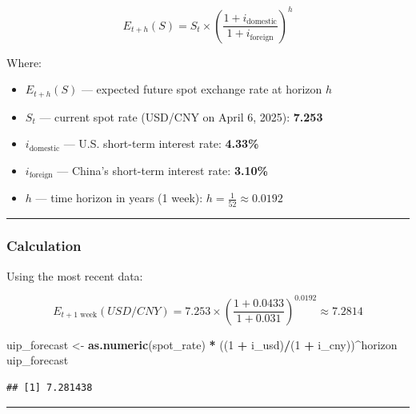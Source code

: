 \documentclass[
]{article}
\newenvironment{Shaded}{\begin{snugshade}}{\end{snugshade}}
\newcommand{\DecValTok}[1]{\textcolor[rgb]{0.00,0.00,0.81}{#1}}
\newcommand{\FunctionTok}[1]{\textcolor[rgb]{0.13,0.29,0.53}{\textbf{#1}}}
\newcommand{\NormalTok}[1]{#1}
\newcommand{\OtherTok}[1]{\textcolor[rgb]{0.56,0.35,0.01}{#1}}
\newcommand{\SpecialCharTok}[1]{\textcolor[rgb]{0.81,0.36,0.00}{\textbf{#1}}}
\providecommand{\tightlist}{%
  \setlength{\itemsep}{0pt}\setlength{\parskip}{0pt}}
\begin{document}
\[
E_{t+h}(S) = S_t \times \left( \frac{1 + i_{\text{domestic}}}{1 + i_{\text{foreign}}} \right)^h
\]

Where:

\begin{itemize}
\tightlist
\item
  \(E_{t+h}(S)\) --- expected future spot exchange rate at horizon
  \(h\)\\
\item
  \(S_t\) --- current spot rate (USD/CNY on April 6, 2025):
  \textbf{7.253}\\
\item
  \(i_{\text{domestic}}\) --- U.S. short-term interest rate:
  \textbf{4.33\%}\\
\item
  \(i_{\text{foreign}}\) --- China's short-term interest rate:
  \textbf{3.10\%}\\
\item
  \(h\) --- time horizon in years (1 week):
  \(h = \frac{1}{52} \approx 0.0192\)
\end{itemize}

\begin{center}\rule{0.5\linewidth}{0.5pt}\end{center}

\subsubsection{Calculation}\label{calculation}

Using the most recent data:

\[
E_{t+1\text{ week}}(USD/CNY) = 7.253 \times \left( \frac{1 + 0.0433}{1 + 0.031} \right)^{0.0192} \approx \mathbf{7.2814}
\]

\begin{Shaded}
\begin{Highlighting}[]
\NormalTok{uip\_forecast }\OtherTok{\textless{}{-}} \FunctionTok{as.numeric}\NormalTok{(spot\_rate) }\SpecialCharTok{*}\NormalTok{ ((}\DecValTok{1} \SpecialCharTok{+}\NormalTok{ i\_usd)}\SpecialCharTok{/}\NormalTok{(}\DecValTok{1} \SpecialCharTok{+}\NormalTok{ i\_cny))}\SpecialCharTok{\^{}}\NormalTok{horizon}
\NormalTok{uip\_forecast}
\end{Highlighting}
\end{Shaded}

\begin{verbatim}
## [1] 7.281438
\end{verbatim}

\begin{center}\rule{0.5\linewidth}{0.5pt}\end{center}
\end{document}

